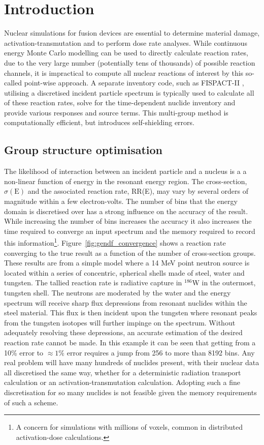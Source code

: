 \section{Introduction}

Nuclear simulations for fusion devices are essential to determine material damage, activation-transmutation and to perform dose rate analyses. While continuous energy Monte Carlo modelling can be used to directly calculate reaction rates, due to the very large number (potentially tens of thousands) of possible reaction channels, it is impractical to compute all nuclear reactions of interest by this so-called point-wise approach. A separate inventory code, such as FISPACT-II \cite{fispact2015}, utilising a discretised incident particle spectrum is typically used to calculate all of these reaction rates, solve for the time-dependent nuclide inventory and provide various responses and source terms. This multi-group method is computationally efficient, but introduces self-shielding errors.

\subsection{Group structure optimisation}
The likelihood of interaction between an incident particle and a nucleus is a a non-linear function of energy in the resonant energy region. The cross-section, $\sigma(\mathrm{E})$ and the associated reaction rate, RR(E), may vary by several orders of magnitude within a few electron-volts. The number of bins that the energy domain is discretised over has a strong influence on the accuracy of the result. While increasing the number of bins increases the accuracy it also increases the time required to converge an input spectrum and the memory required to record this information\footnote{A concern for simulations with millions of voxels, common in distributed activation-dose calculations.}. Figure~\ref{fig:gendf_convergence} shows a reaction rate converging to the true result as a function of the number of cross-section groups. These results are from a simple model where a 14 MeV point neutron source is located within a series of concentric, spherical shells made of steel, water and tungsten. The tallied reaction rate is radiative capture in $^{186}$W in the outermost, tungsten shell. The neutrons are moderated by the water and the energy spectrum will receive sharp flux depressions from resonant nuclides within the steel material. This flux is then incident upon the tungsten where resonant peaks from the tungsten isotopes will further impinge on the spectrum. Without adequately resolving these depressions, an accurate estimation of the desired reaction rate cannot be made. In this example it can be seen that getting from a 10\% error to $\approx 1\%$ error requires a jump from 256 to more than 8192 bins. Any real problem will have many hundreds of nuclides present, with their nuclear data all discretised the same way, whether for a deterministic radiation transport calculation or an activation-transmutation calculation. Adopting such a fine discretisation for so many nuclides is not feasible given the memory requirements of such a scheme.

